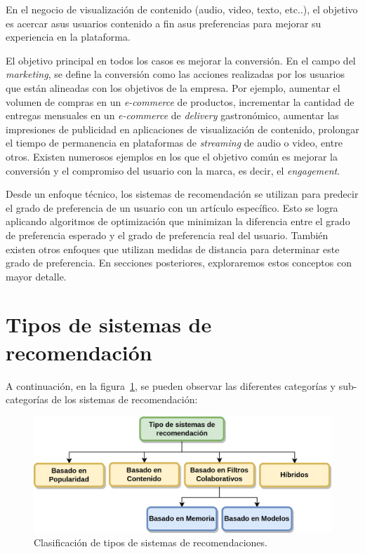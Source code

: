\documentclass[11pt,a4paper,twoside]{thesis}
\begin{document}
En el negocio de visualización de contenido (audio, video, texto, etc..), el
objetivo es acercar asus usuarios contenido a fin asus preferencias para
mejorar su experiencia en la plataforma.

El objetivo principal en todos los casos es mejorar la conversión. En el campo
del \textit{marketing}, se define la conversión como las acciones realizadas
por los usuarios que están alineadas con los objetivos de la empresa. Por
ejemplo, aumentar el volumen de compras en un \textit{e-commerce} de productos,
incrementar la cantidad de entregas mensuales en un \textit{e-commerce} de
\textit{delivery} gastronómico, aumentar las impresiones de publicidad en
aplicaciones de visualización de contenido, prolongar el tiempo de permanencia
en plataformas de \textit{streaming} de audio o video, entre otros. Existen
numerosos ejemplos en los que el objetivo común es mejorar la conversión y el
compromiso del usuario con la marca, es decir, el \textit{engagement}.

Desde un enfoque técnico, los sistemas de recomendación se utilizan para
predecir el grado de preferencia de un usuario con un artículo específico. Esto
se logra aplicando algoritmos de optimización que minimizan la diferencia entre
el grado de preferencia esperado y el grado de preferencia real del usuario.
También existen otros enfoques que utilizan medidas de distancia para
determinar este grado de preferencia. En secciones posteriores, exploraremos
estos conceptos con mayor detalle.

\clearpage
\section{Tipos de sistemas de recomendación}

A continuación, en la figura~\ref{fig:clasification}, se pueden observar las
diferentes categorías y sub-categorías de los sistemas de recomendación:

\begin{figure}[!htb]
	\centering
	\includegraphics[width=12cm]{./images/clasificacion-sis-rec.png}
	\caption{Clasificación de tipos de sistemas de recomendaciones.}
	\label{fig:clasification}
\end{figure}
\end{document}
